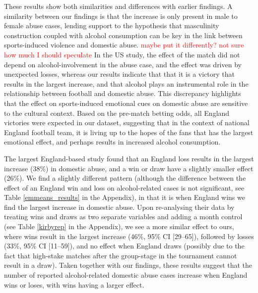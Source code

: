 \documentclass[12pt, letterpaper]{article}
\begin{document}
These results show both similarities and differences with earlier findings. A similarity between our findings is that the increase is only present in male to female abuse cases, lending support to the hypothesis that masculinity construction coupled with alcohol consumption can be key in the link between sports-induced violence and domestic abuse. \textcolor{red}{maybe put it differently? not sure how much I should speculate} In the US study\autocite{Card2011}, the effect of the match did not depend on alcohol-involvement in the abuse case, and the effect was driven by unexpected losses, whereas our results indicate that that it is a victory that results in the largest increase, and that alcohol plays an instrumental role in the relationship between football and domestic abuse. This discrepancy highlights that the effect on sports-induced emotional cues on domestic abuse are sensitive to the cultural context. Based on the pre-match betting odds, all England victories were expected in our dataset, suggesting that in the context of national England football team, it is living up to the hopes of the fans that has the largest emotional effect, and perhaps results in increased alcohol consumption\autocite{Davies2018}.


The largest England-based study found that an England loss results in the largest increase (38\%) in domestic abuse, and a win or draw have a slightly smaller effect (26\%)\autocite{Kirby2014}. We find a slightly different pattern (although the difference between the effect of an England win and loss on alcohol-related cases is not significant, see Table \ref{emmeans_results} in the Appendix), in that it is when England wins we find the largest increase in domestic abuse. Upon re-analysing their data by treating wins and draws as two separate variables and adding a month control (see Table \ref{kirbyrep} in the Appendix), we see a more similar effect to ours, where wins result in the largest increase (46\%, 95\% CI [29--65]), followed by losses (33\%, 95\% CI [11--59]), and no effect when England draws (possibly due to the fact that high-stake matches after the group-stage in the tournament cannot result in a draw). Taken together with our findings, these results suggest that the number of reported alcohol-related domestic abuse cases increase when England wins or loses, with wins having a larger effect.
\end{document}
